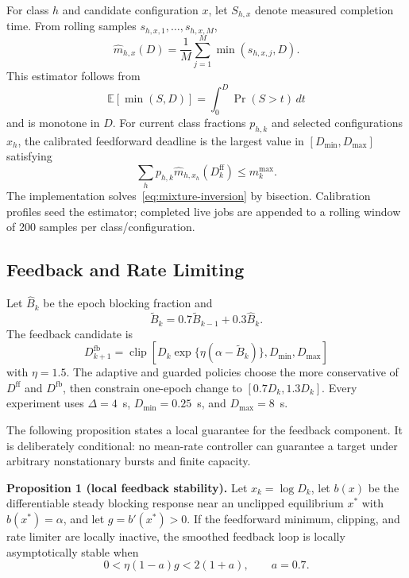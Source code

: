 For class $h$ and candidate configuration $x$, let $S_{h,x}$ denote measured completion time. From rolling samples $s_{h,x,1},\ldots,s_{h,x,M}$,
\begin{equation}
 \widehat m_{h,x}(D)=\frac{1}{M}\sum_{j=1}^{M}\min(s_{h,x,j},D).
 \label{eq:empirical-truncated}
\end{equation}
This estimator follows from
\begin{equation}
 \mathbb{E}[\min(S,D)]=\int_0^D \Pr(S>t)\,dt
\end{equation}
and is monotone in $D$. For current class fractions $p_{h,k}$ and selected configurations $x_h$, the calibrated feedforward deadline is the largest value in $[D_{\min},D_{\max}]$ satisfying
\begin{equation}
 \sum_h p_{h,k}\widehat m_{h,x_h}(D_k^{\mathrm{ff}})\le m_k^{\max}.
 \label{eq:mixture-inversion}
\end{equation}
The implementation solves~\eqref{eq:mixture-inversion} by bisection. Calibration profiles seed the estimator; completed live jobs are appended to a rolling window of 200 samples per class/configuration.

\subsection{Feedback and Rate Limiting}

Let $\widehat B_k$ be the epoch blocking fraction and
\begin{equation}
 \widetilde B_k=0.7\widetilde B_{k-1}+0.3\widehat B_k.
\end{equation}
The feedback candidate is
\begin{equation}
 D_{k+1}^{\mathrm{fb}}=\operatorname{clip}\left[
 D_k\exp\{\eta(\alpha-\widetilde B_k)\},D_{\min},D_{\max}\right]
 \label{eq:feedback}
\end{equation}
with $\eta=1.5$. The adaptive and guarded policies choose the more conservative of $D^{\mathrm{ff}}$ and $D^{\mathrm{fb}}$, then constrain one-epoch change to $[0.7D_k,1.3D_k]$. Every experiment uses $\Delta=4$~s, $D_{\min}=0.25$~s, and $D_{\max}=8$~s.

The following proposition states a local guarantee for the feedback component. It is deliberately conditional: no mean-rate controller can guarantee a target under arbitrary nonstationary bursts and finite capacity.

\textbf{Proposition 1 (local feedback stability).} Let $x_k=\log D_k$, let $b(x)$ be the differentiable steady blocking response near an unclipped equilibrium $x^*$ with $b(x^*)=\alpha$, and let $g=b'(x^*)>0$. If the feedforward minimum, clipping, and rate limiter are locally inactive, the smoothed feedback loop is locally asymptotically stable when
\begin{equation}
 0<\eta(1-a)g<2(1+a), \qquad a=0.7.
 \label{eq:stability-condition}
\end{equation}


